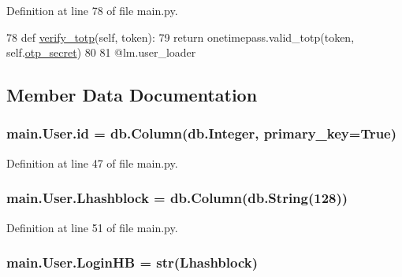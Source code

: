 Definition at line 78 of file main.\+py.


\begin{DoxyCode}
78     \textcolor{keyword}{def }\hyperlink{classmain_1_1User_a390f1500b4c2fe34d0ba3cf8d1d54906}{verify\_totp}(self, token):
79         \textcolor{keywordflow}{return} onetimepass.valid\_totp(token, self.\hyperlink{classmain_1_1User_a2a7a2d67099632b248ad93661e9733d2}{otp\_secret})
80 
81 @lm.user\_loader
\end{DoxyCode}


\subsection{Member Data Documentation}
\subsubsection[{\texorpdfstring{id}{id}}]{\setlength{\rightskip}{0pt plus 5cm}main.\+User.\+id = db.\+Column(db.\+Integer, primary\+\_\+key=True)\hspace{0.3cm}{\ttfamily [static]}}\hypertarget{classmain_1_1User_af213bc1240b634425b1b571d6bccc561}{}\label{classmain_1_1User_af213bc1240b634425b1b571d6bccc561}


Definition at line 47 of file main.\+py.

\subsubsection[{\texorpdfstring{Lhashblock}{Lhashblock}}]{\setlength{\rightskip}{0pt plus 5cm}main.\+User.\+Lhashblock = db.\+Column(db.\+String(128))\hspace{0.3cm}{\ttfamily [static]}}\hypertarget{classmain_1_1User_aa3b839482f4a293703c22ae82e9c639d}{}\label{classmain_1_1User_aa3b839482f4a293703c22ae82e9c639d}


Definition at line 51 of file main.\+py.

\subsubsection[{\texorpdfstring{Login\+HB}{LoginHB}}]{\setlength{\rightskip}{0pt plus 5cm}main.\+User.\+Login\+HB = str({\bf Lhashblock})\hspace{0.3cm}{\ttfamily [static]}}\hypertarget{classmain_1_1User_aece6256cb85b54493c6d05185f112716}{}\label{classmain_1_1User_aece6256cb85b54493c6d05185f112716}


